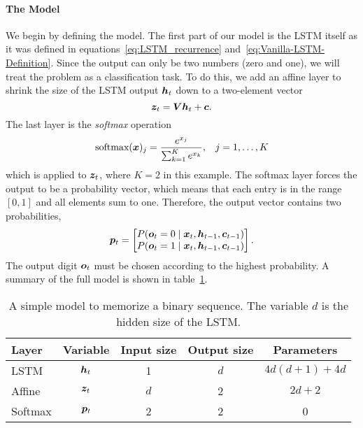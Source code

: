 		\paragraph{The Model}
		We begin by defining the model.
		The first part of our model is the LSTM itself as it was defined in equations~\ref{eq:LSTM_recurrence} and~\ref{eq:Vanilla-LSTM-Definition}.
		Since the output can only be two numbers (zero and one), we will treat the problem as a classification task.
		To do this, we add an affine layer to shrink the size of the LSTM output $\bm{h}_t$ down to a two-element vector
		\begin{equation}
			\bm{z}_t = \bm{V} \bm{h}_t + \bm{c}.
		\end{equation}
		The last layer is the \emph{softmax} operation
		\begin{eqnarray}
			\text{softmax}(\bm{x})_j = \frac{e^{x_{j}}}{\sum_{k=1}^{K} e^{x_{k}}},  & & j = 1, \dots, K
		\end{eqnarray}
		which is applied to $\bm{z}_t$, where $K = 2$ in this example.
		The softmax layer forces the output to be a probability vector, which means that each entry is in the range $[0, 1]$ and all elements sum to one.
		Therefore, the output vector contains two probabilities, 
		\begin{equation*}
			\bm{p}_t = 
			\begin{bmatrix}
				P(\bm{o}_t = 0 \mid \bm{x}_t, \bm{h}_{t - 1}, \bm{c}_{t - 1}) \\ 
				P(\bm{o}_t = 1 \mid \bm{x}_t, \bm{h}_{t - 1}, \bm{c}_{t - 1})
			\end{bmatrix}.
		\end{equation*}
		The output digit $\bm{o}_t$ must be chosen according to the highest probability.
		A summary of the full model is shown in table~\ref{tbl:model_classification_binary_digits}.
		\begin{table}[tb]
			\small
			\begin{center}
				\begin{tabular}{|l|c|c|c|c|}
					\hline
					Layer 	& Variable 			& Input size 	& Output size 	& Parameters 			\\ \hline
					LSTM 	& $\bm{h}_t$		& 1 			& $d$ 			& $4d(d + 1) + 4d$ 		\\ \hline
					Affine 	& $\bm{z}_t$		& $d$ 			& 2 			& $2d + 2$ 				\\ \hline
					Softmax & $\bm{p}_t$		& 2 			& 2 			& 0						\\ \hline
				\end{tabular}
			\end{center}
			\caption[A simple model to memorize a binary sequence]
					{A simple model to memorize a binary sequence. 
				 The variable $d$ is the hidden size of the LSTM.}
			\label{tbl:model_classification_binary_digits}
		\end{table}
		
